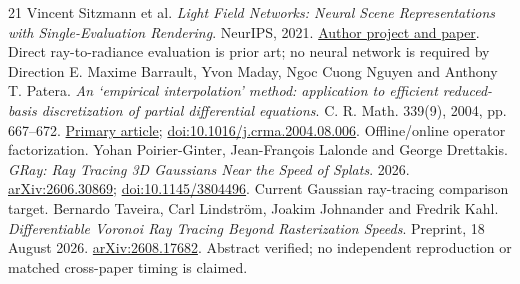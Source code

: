 \documentclass[11pt,letterpaper]{article}
\begin{document}
\begin{thebibliography}{21}
 Vincent Sitzmann et al. \textit{Light Field Networks: Neural Scene Representations with Single-Evaluation Rendering}. NeurIPS, 2021. \href{https://www.vincentsitzmann.com/lfns/}{Author project and paper}. Direct ray-to-radiance evaluation is prior art; no neural network is required by Direction E.
 Maxime Barrault, Yvon Maday, Ngoc Cuong Nguyen and Anthony T. Patera. \textit{An `empirical interpolation' method: application to efficient reduced-basis discretization of partial differential equations}. C. R. Math. 339(9), 2004, pp. 667--672. \href{https://www.numdam.org/item/CRMATH_2004__339_9_667_0/}{Primary article}; \href{https://doi.org/10.1016/j.crma.2004.08.006}{doi:10.1016/j.crma.2004.08.006}. Offline/online operator factorization.
 Yohan Poirier-Ginter, Jean-Fran\c{c}ois Lalonde and George Drettakis. \textit{GRay: Ray Tracing 3D Gaussians Near the Speed of Splats}. 2026. \href{https://arxiv.org/html/2606.30869v1}{arXiv:2606.30869}; \href{https://doi.org/10.1145/3804496}{doi:10.1145/3804496}. Current Gaussian ray-tracing comparison target.
 Bernardo Taveira, Carl Lindstr\"om, Joakim Johnander and Fredrik Kahl. \textit{Differentiable Voronoi Ray Tracing Beyond Rasterization Speeds}. Preprint, 18 August 2026. \href{https://arxiv.org/abs/2608.17682}{arXiv:2608.17682}. Abstract verified; no independent reproduction or matched cross-paper timing is claimed.
\end{thebibliography}
\endgroup
\end{document}
